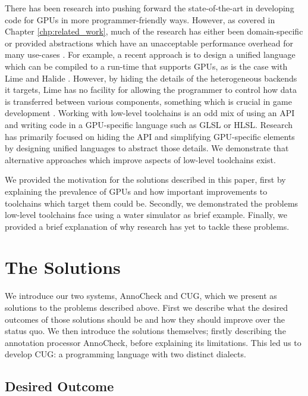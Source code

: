 \documentclass[a4paper,12pt,twoside,openright]{report}
\begin{document}
There has been research into pushing forward the state-of-the-art in developing
code for GPUs in more programmer-friendly ways. However, as covered in Chapter
\ref{chp:related_work}, much of the research has either been domain-specific or
provided abstractions which have an unacceptable performance overhead for many
use-cases \cite{CAMPFail1}. For example, a recent approach is to design a
unified language which can be compiled to a run-time that supports GPUs, as is
the case with Lime and Halide \cite{Lime2010} \cite{Halide}. However, by hiding
the details of the heterogeneous backends it targets, Lime has no facility for
allowing the programmer to control how data is transferred between various
components, something which is crucial in game development \cite{LowLevelGPU}.
Working with low-level toolchains is an odd mix of using an API and writing
code in a GPU-specific language such as GLSL or HLSL. Research has primarily
focused on hiding the API and simplifying GPU-specific elements by designing
unified languages to abstract those details. We demonstrate that alternative
approaches which improve aspects of low-level toolchains exist.

We provided the motivation for the solutions described in this paper, first by
explaining the prevalence of GPUs and how important improvements to toolchains
which target them could be. Secondly, we demonstrated the problems low-level
toolchains face using a water simulator as brief example. Finally, we provided
a brief explanation of why research has yet to tackle these problems.

\section{The Solutions}

\label{sec:solutions_introduction}

We introduce our two systems, AnnoCheck and CUG, which we present as solutions
to the problems described above. First we describe what the desired outcomes of
those solutions should be and how they should improve over the status quo. We
then introduce the solutions themselves; firstly describing the annotation
processor AnnoCheck, before explaining its limitations. This led us to develop
CUG: a programming language with two distinct dialects.

\subsection{Desired Outcome}
\end{document}
